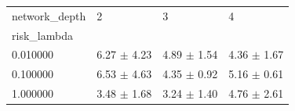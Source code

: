 \begin{tabular}{llll}
\toprule
network_depth & 2 & 3 & 4 \\
risk_lambda &  &  &  \\
\midrule
0.010000 & 6.27 $\pm$ 4.23 & 4.89 $\pm$ 1.54 & 4.36 $\pm$ 1.67 \\
0.100000 & 6.53 $\pm$ 4.63 & 4.35 $\pm$ 0.92 & 5.16 $\pm$ 0.61 \\
1.000000 & 3.48 $\pm$ 1.68 & 3.24 $\pm$ 1.40 & 4.76 $\pm$ 2.61 \\
\bottomrule
\end{tabular}
